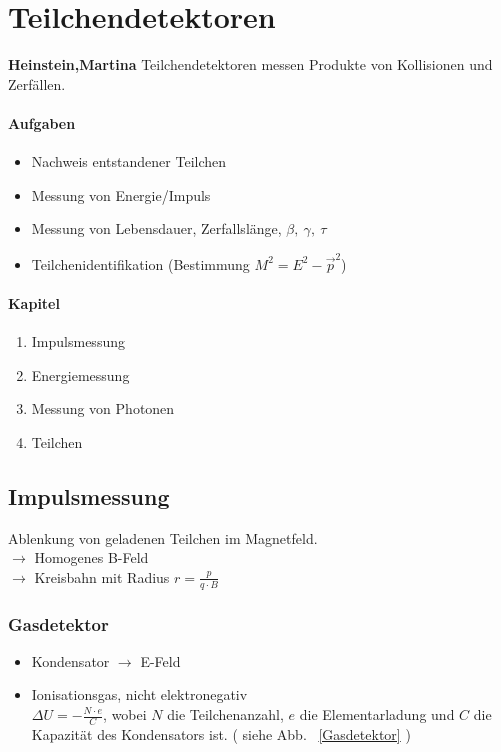 \documentclass[Ex4_Zusammenfassung.tex]{subfiles}
\begin{document}
\chapter{Teilchendetektoren}
\textbf{Heinstein,Martina} \newline
Teilchendetektoren messen Produkte von Kollisionen und Zerfällen.

\subsubsection*{Aufgaben}
\begin{itemize}
	\item Nachweis entstandener Teilchen
	\item Messung von Energie/Impuls
	\item Messung von Lebensdauer, Zerfallslänge, $\beta,\ \gamma,\ \tau$
	\item Teilchenidentifikation (Bestimmung $M^2 = E^2 - \vec{p}^2$)
\end{itemize}

\subsubsection*{Kapitel}
\begin{enumerate}[\hspace{0.5cm}{4.}1]
\item Impulsmessung
\item Energiemessung
\item Messung von Photonen
\item Teilchen
\end{enumerate}

\section{Impulsmessung}
Ablenkung von geladenen Teilchen im Magnetfeld.\\
$\rightarrow$ Homogenes B-Feld\\
$\rightarrow$ Kreisbahn mit Radius $r=\frac{p}{q\cdot B}$

\subsection*{Gasdetektor}
\begin{itemize}
	\item Kondensator $\rightarrow$ E-Feld
	\item Ionisationsgas, nicht elektronegativ\\ $\Delta U = -\frac{N\cdot e }{C}$, wobei $N$ die Teilchenanzahl, $e$ die Elementarladung und $C$ die Kapazität des Kondensators ist. ( siehe Abb. ~\ref{Gasdetektor} )
\end{itemize}
\end{document}
